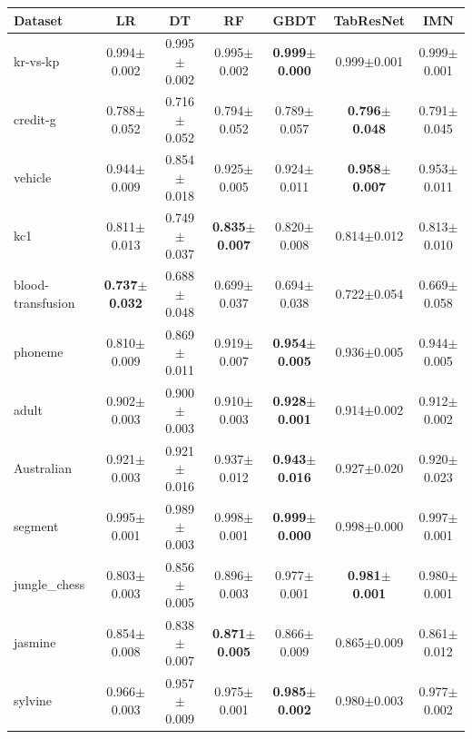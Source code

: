 \begin{tabular}{lcccccc}
\toprule
Dataset & LR & DT & RF & GBDT & TabResNet & IMN \\
\midrule
kr-vs-kp & 0.994{\tiny$\pm$0.002} & 0.995{\tiny$\pm$0.002} & 0.995{\tiny$\pm$0.002} & \textbf{0.999{\tiny$\pm$0.000}} & 0.999{\tiny$\pm$0.001} & 0.999{\tiny$\pm$0.001} \\
credit-g & 0.788{\tiny$\pm$0.052} & 0.716{\tiny$\pm$0.052} & 0.794{\tiny$\pm$0.052} & 0.789{\tiny$\pm$0.057} & \textbf{0.796{\tiny$\pm$0.048}} & 0.791{\tiny$\pm$0.045} \\
vehicle & 0.944{\tiny$\pm$0.009} & 0.854{\tiny$\pm$0.018} & 0.925{\tiny$\pm$0.005} & 0.924{\tiny$\pm$0.011} & \textbf{0.958{\tiny$\pm$0.007}} & 0.953{\tiny$\pm$0.011} \\
kc1 & 0.811{\tiny$\pm$0.013} & 0.749{\tiny$\pm$0.037} & \textbf{0.835{\tiny$\pm$0.007}} & 0.820{\tiny$\pm$0.008} & 0.814{\tiny$\pm$0.012} & 0.813{\tiny$\pm$0.010} \\
blood-transfusion & \textbf{0.737{\tiny$\pm$0.032}} & 0.688{\tiny$\pm$0.048} & 0.699{\tiny$\pm$0.037} & 0.694{\tiny$\pm$0.038} & 0.722{\tiny$\pm$0.054} & 0.669{\tiny$\pm$0.058} \\
phoneme & 0.810{\tiny$\pm$0.009} & 0.869{\tiny$\pm$0.011} & 0.919{\tiny$\pm$0.007} & \textbf{0.954{\tiny$\pm$0.005}} & 0.936{\tiny$\pm$0.005} & 0.944{\tiny$\pm$0.005} \\
adult & 0.902{\tiny$\pm$0.003} & 0.900{\tiny$\pm$0.003} & 0.910{\tiny$\pm$0.003} & \textbf{0.928{\tiny$\pm$0.001}} & 0.914{\tiny$\pm$0.002} & 0.912{\tiny$\pm$0.002} \\
Australian & 0.921{\tiny$\pm$0.003} & 0.921{\tiny$\pm$0.016} & 0.937{\tiny$\pm$0.012} & \textbf{0.943{\tiny$\pm$0.016}} & 0.927{\tiny$\pm$0.020} & 0.920{\tiny$\pm$0.023} \\
segment & 0.995{\tiny$\pm$0.001} & 0.989{\tiny$\pm$0.003} & 0.998{\tiny$\pm$0.001} & \textbf{0.999{\tiny$\pm$0.000}} & 0.998{\tiny$\pm$0.000} & 0.997{\tiny$\pm$0.001} \\
jungle\_chess & 0.803{\tiny$\pm$0.003} & 0.856{\tiny$\pm$0.005} & 0.896{\tiny$\pm$0.003} & 0.977{\tiny$\pm$0.001} & \textbf{0.981{\tiny$\pm$0.001}} & 0.980{\tiny$\pm$0.001} \\
jasmine & 0.854{\tiny$\pm$0.008} & 0.838{\tiny$\pm$0.007} & \textbf{0.871{\tiny$\pm$0.005}} & 0.866{\tiny$\pm$0.009} & 0.865{\tiny$\pm$0.009} & 0.861{\tiny$\pm$0.012} \\
sylvine & 0.966{\tiny$\pm$0.003} & 0.957{\tiny$\pm$0.009} & 0.975{\tiny$\pm$0.001} & \textbf{0.985{\tiny$\pm$0.002}} & 0.980{\tiny$\pm$0.003} & 0.977{\tiny$\pm$0.002} \\
\bottomrule
\end{tabular}
